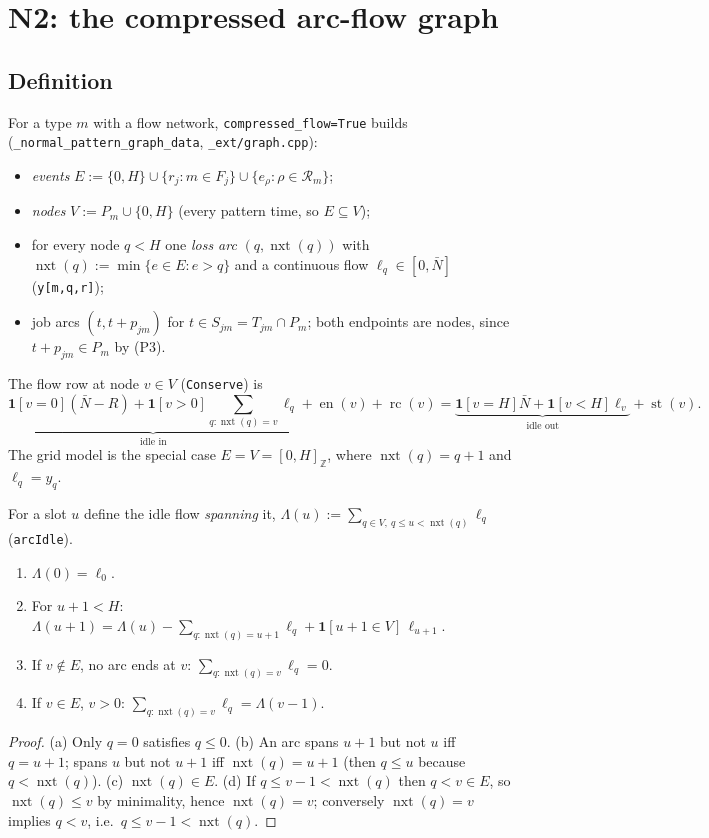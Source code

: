 \documentclass[11pt,a4paper]{article}
\newcommand{\Starts}{\operatorname{st}}
\newcommand{\Ends}{\operatorname{en}}
\newcommand{\Rc}{\operatorname{rc}}
\newcommand{\Nxt}{\operatorname{nxt}}
\newcommand{\Z}{\mathbb{Z}}
\newcommand{\code}[1]{\texttt{#1}}
\newcommand{\lean}[1]{\texttt{\small #1}}
\newcommand{\ind}[1]{\mathbf{1}[#1]}
\begin{document}
\section{N2: the compressed arc-flow graph}\label{sec:N2}

\subsection{Definition}

For a type $m$ with a flow network, \code{compressed\_flow=True} builds
(\code{\_normal\_pattern\_graph\_data}, \code{\_ext/graph.cpp}):
\begin{itemize}[nosep]
  \item \emph{events} $E := \{0,H\}\cup\{r_j : m\in F_j\}\cup\{e_\rho:\rho\in\mathcal R_m\}$;
  \item \emph{nodes} $V := P_m\cup\{0,H\}$ (every pattern time, so $E\subseteq V$);
  \item for every node $q<H$ one \emph{loss arc} $(q,\Nxt(q))$ with
    $\Nxt(q):=\min\{e\in E: e>q\}$ and a continuous flow
    $\ell_q\in[0,\bar N]$ (\code{y[m,q,r]});
  \item job arcs $(t,t+p_{jm})$ for $t\in S_{jm}=T_{jm}\cap P_m$; both
    endpoints are nodes, since $t+p_{jm}\in P_m$ by (P3).
\end{itemize}
The flow row at node $v\in V$ (\lean{Conserve}) is
\begin{equation}\label{eq:cflow}
\underbrace{\ind{v=0}(\bar N-R)+\ind{v>0}\!\!\sum_{q:\Nxt(q)=v}\!\!\ell_q}_{\text{idle in}}
+\Ends(v)+\Rc(v)
=\underbrace{\ind{v=H}\bar N+\ind{v<H}\ell_v}_{\text{idle out}}+\Starts(v).
\end{equation}
The grid model is the special case $E=V=[0,H]_\Z$, where $\Nxt(q)=q+1$ and
$\ell_q=y_q$.

For a slot $u$ define the idle flow \emph{spanning} it,
$\Lambda(u):=\sum_{q\in V,\ q\le u<\Nxt(q)}\ell_q$ (\lean{arcIdle}).

\begin{lemma}\label{lem:arcs}
\begin{enumerate}[label=(\alph*),nosep]
  \item $\Lambda(0)=\ell_0$.
  \item For $u+1<H$: $\Lambda(u+1)=\Lambda(u)-\sum_{q:\Nxt(q)=u+1}\ell_q+\ind{u+1\in V}\,\ell_{u+1}$.
  \item If $v\notin E$, no arc ends at $v$: $\sum_{q:\Nxt(q)=v}\ell_q=0$.
  \item If $v\in E$, $v>0$: $\sum_{q:\Nxt(q)=v}\ell_q=\Lambda(v-1)$.
\end{enumerate}
\end{lemma}
\begin{proof}
(a) Only $q=0$ satisfies $q\le0$. (b) An arc spans $u+1$ but not $u$ iff
$q=u+1$; spans $u$ but not $u+1$ iff $\Nxt(q)=u+1$ (then $q\le u$ because
$q<\Nxt(q)$). (c) $\Nxt(q)\in E$. (d) If $q\le v-1<\Nxt(q)$ then $q<v\in E$, so
$\Nxt(q)\le v$ by minimality, hence $\Nxt(q)=v$; conversely $\Nxt(q)=v$
implies $q<v$, i.e.\ $q\le v-1<\Nxt(q)$.
\end{proof}
\end{document}
